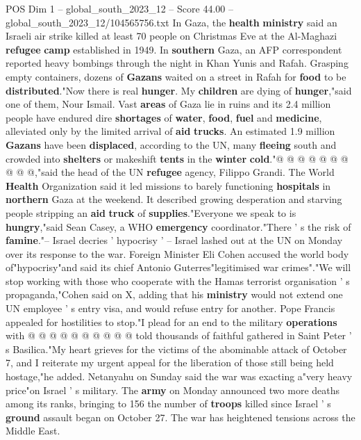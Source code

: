 \begin{textsample}{POS Dim 1 – global\_south\_2023\_12 – Score 44.00 – global\_south\_2023\_12/104565756.txt}
In Gaza, the \textbf{health} \textbf{ministry} said an Israeli air strike killed at least 70 people on Christmas Eve at the Al-Maghazi \textbf{refugee} \textbf{camp} established in 1949.
In \textbf{southern} Gaza, an AFP correspondent reported heavy bombings through the night in Khan Yunis and Rafah.
Grasping empty containers, dozens of \textbf{Gazans} waited on a street in Rafah for \textbf{food} to be \textbf{distributed}."Now there is real \textbf{hunger}.
My \textbf{children} are dying of \textbf{hunger},"said one of them, Nour Ismail.
Vast \textbf{areas} of Gaza lie in ruins and its 2.4 million people have endured dire \textbf{shortages} of \textbf{water}, \textbf{food}, \textbf{fuel} and \textbf{medicine}, alleviated only by the limited arrival of \textbf{aid} \textbf{trucks}.
An estimated 1.9 million \textbf{Gazans} have been \textbf{displaced}, according to the UN, many \textbf{fleeing} south and crowded into \textbf{shelters} or makeshift \textbf{tents} in the \textbf{winter} \textbf{cold}."@ @ @ @ @ @ @ @ @ @,"said the head of the UN \textbf{refugee} agency, Filippo Grandi.
The World \textbf{Health} Organization said it led missions to barely functioning \textbf{hospitals} in \textbf{northern} Gaza at the weekend.
It described growing desperation and starving people stripping an \textbf{aid} \textbf{truck} of \textbf{supplies}."Everyone we speak to is \textbf{hungry},"said Sean Casey, a WHO \textbf{emergency} coordinator."There ' s the risk of \textbf{famine}."-- Israel decries ' hypocrisy ' -- Israel lashed out at the UN on Monday over its response to the war.
Foreign Minister Eli Cohen accused the world body of"hypocrisy"and said its chief Antonio Guterres"legitimised war crimes"."We will stop working with those who cooperate with the Hamas terrorist organisation ' s propaganda,"Cohen said on X, adding that his \textbf{ministry} would not extend one UN employee ' s entry visa, and would refuse entry for another.
Pope Francis appealed for hostilities to stop."I plead for an end to the military \textbf{operations} with @ @ @ @ @ @ @ @ @ @ told thousands of faithful gathered in Saint Peter ' s Basilica."My heart grieves for the victims of the abominable attack of October 7, and I reiterate my urgent appeal for the liberation of those still being held hostage,"he added.
Netanyahu on Sunday said the war was exacting a"very heavy price"on Israel ' s military.
The \textbf{army} on Monday announced two more deaths among its ranks, bringing to 156 the number of \textbf{troops} killed since Israel ' s \textbf{ground} assault began on October 27.
The war has heightened tensions across the Middle East.

\end{textsample}
